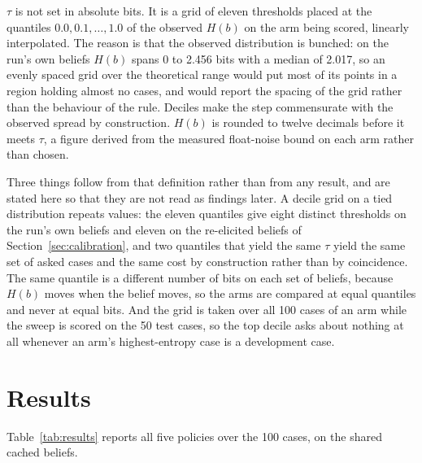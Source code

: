 \documentclass{article}
\begin{document}
$\tau$ is not set in absolute bits. It is a grid of eleven thresholds placed at the
quantiles $0.0, 0.1, \ldots, 1.0$ of the observed $H(b)$ on the arm being scored,
linearly interpolated. The reason is that the observed distribution is bunched: on
the run's own beliefs $H(b)$ spans 0 to 2.456 bits with a median of 2.017, so an
evenly spaced grid over the theoretical range would put most of its points in a
region holding almost no cases, and would report the spacing of the grid rather
than the behaviour of the rule. Deciles make the step commensurate with the
observed spread by construction. $H(b)$ is rounded to twelve decimals before it
meets $\tau$, a figure derived from the measured float-noise bound on each arm
rather than chosen.

Three things follow from that definition rather than from any result, and are
stated here so that they are not read as findings later. A decile grid on a tied
distribution repeats values: the eleven quantiles give eight distinct thresholds on
the run's own beliefs and eleven on the re-elicited beliefs of
Section~\ref{sec:calibration}, and two quantiles that yield the same $\tau$ yield
the same set of asked cases and the same cost by construction rather than by
coincidence. The same quantile is a different number of bits on each set of
beliefs, because $H(b)$ moves when the belief moves, so the arms are compared at
equal quantiles and never at equal bits. And the grid is taken over all 100 cases
of an arm while the sweep is scored on the 50 test cases, so the top decile asks
about nothing at all whenever an arm's highest-entropy case is a development case.

\section{Results}
\label{sec:results}

Table~\ref{tab:results} reports all five policies over the 100 cases, on the
shared cached beliefs.
\end{document}
